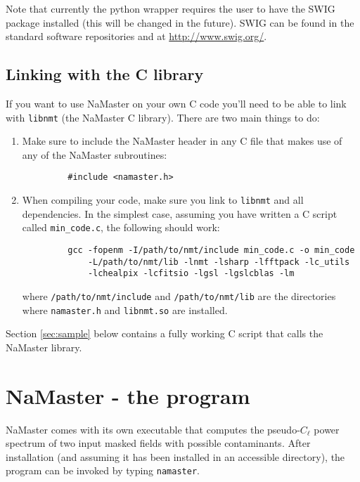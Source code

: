 \documentclass[a4paper,10pt]{article}
\begin{document}
Note that currently the python wrapper requires the user to have the SWIG package installed (this will be changed in the future). SWIG can be found in the standard software repositories and at \url{http://www.swig.org/}.

\subsection*{Linking with the C library}
If you want to use NaMaster on your own C code you'll need to be able to link with {\tt libnmt} (the NaMaster C library). There are two main things to do:
\begin{enumerate}
 \item Make sure to include the NaMaster header in any C file that makes use of any of the NaMaster subroutines:
       \begin{verbatim}
         #include <namaster.h>
       \end{verbatim}
 \item When compiling your code, make sure you link to {\tt libnmt} and all dependencies. In the simplest case, assuming you have written a C script called {\tt min\_code.c}, the following should work:
       \begin{verbatim}
         gcc -fopenm -I/path/to/nmt/include min_code.c -o min_code
             -L/path/to/nmt/lib -lnmt -lsharp -lfftpack -lc_utils
             -lchealpix -lcfitsio -lgsl -lgslcblas -lm
       \end{verbatim}
       where {\tt /path/to/nmt/include} and {\tt /path/to/nmt/lib} are the directories where {\tt namaster.h} and {\tt libnmt.so} are installed.
\end{enumerate}
Section \ref{sec:sample} below contains a fully working C script that calls the NaMaster library.

\section{NaMaster - the program}
NaMaster comes with its own executable that computes the pseudo-$C_\ell$ power spectrum of two input masked fields with possible contaminants. After installation (and assuming it has been installed in an accessible directory), the program can be invoked by typing {\tt namaster}.
\end{document}
